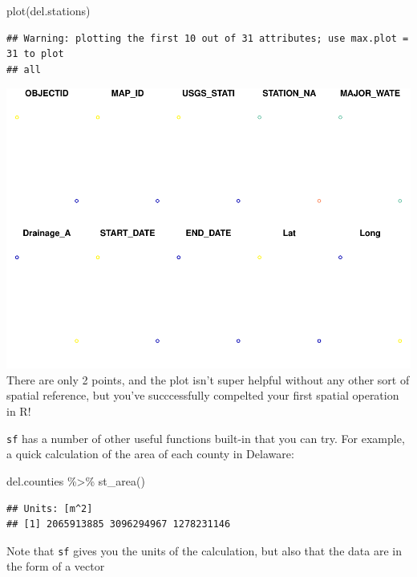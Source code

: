 \documentclass[]{article}
\newenvironment{Shaded}{\begin{snugshade}}{\end{snugshade}}
\newcommand{\FunctionTok}[1]{\textcolor[rgb]{0.00,0.00,0.00}{#1}}
\newcommand{\NormalTok}[1]{#1}
\newcommand{\SpecialCharTok}[1]{\textcolor[rgb]{0.00,0.00,0.00}{#1}}
\begin{document}
\begin{Shaded}
\begin{Highlighting}[]
\FunctionTok{plot}\NormalTok{(del.stations)}
\end{Highlighting}
\end{Shaded}

\begin{verbatim}
## Warning: plotting the first 10 out of 31 attributes; use max.plot = 31 to plot
## all
\end{verbatim}

\includegraphics{lab01_files/figure-latex/mypoints-1.pdf} There are only
2 points, and the plot isn't super helpful without any other sort of
spatial reference, but you've succcessfully compelted your first spatial
operation in R!

\texttt{sf} has a number of other useful functions built-in that you can
try. For example, a quick calculation of the area of each county in
Delaware:

\begin{Shaded}
\begin{Highlighting}[]
\NormalTok{del.counties }\SpecialCharTok{\%\textgreater{}\%} \FunctionTok{st\_area}\NormalTok{() }
\end{Highlighting}
\end{Shaded}

\begin{verbatim}
## Units: [m^2]
## [1] 2065913885 3096294967 1278231146
\end{verbatim}

Note that \texttt{sf} gives you the units of the calculation, but also
that the data are in the form of a vector
\end{document}
